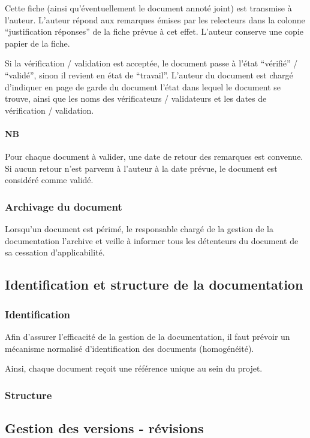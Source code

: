 \documentclass[a4paper]{article}
\begin{document}
Cette fiche (ainsi qu'éventuellement le document annoté joint) est transmise à l'auteur.
L'auteur répond aux remarques émises par les relecteurs dans la colonne ``justification réponses'' de la fiche prévue à cet effet.
L'auteur conserve une copie papier de la fiche.

Si la vérification / validation est acceptée, le document passe à l'état ``vérifié'' / ``validé'', sinon il revient en état de ``travail''.
L'auteur du document est chargé d'indiquer en page de garde du document l'état dans lequel le document se trouve, ainsi que les noms des vérificateurs / validateurs et les dates de vérification / validation.

\paragraph{NB} Pour chaque document à valider, une date de retour des remarques est convenue. Si aucun retour n'est parvenu à l'auteur à la date prévue, le document est considéré comme validé.

\subsubsection{Archivage du document}

Lorsqu'un document est périmé, le responsable chargé de la gestion de la documentation l'archive et veille à informer tous les détenteurs du document de sa cessation d'applicabilité.

\subsection{Identification et structure de la documentation}

\subsubsection{Identification}

Afin d’assurer l’efficacité de la gestion de la documentation, il faut prévoir un mécanisme normalisé d’identification des documents (homogénéité).

Ainsi, chaque document reçoit une référence unique au sein du projet.

\subsubsection{Structure}

\subsection{Gestion des versions - révisions}
\end{document}
